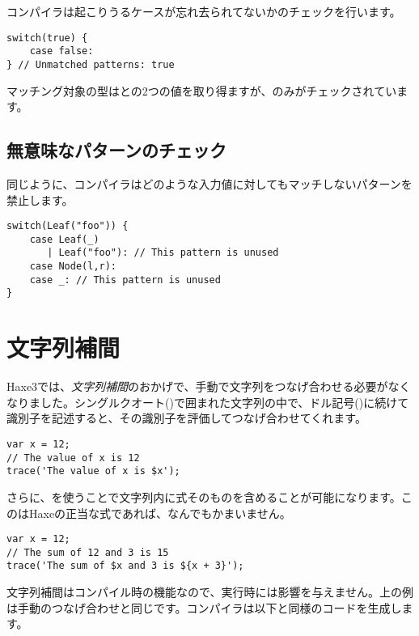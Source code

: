 コンパイラは起こりうるケースが忘れ去られてないかのチェックを行います。

\begin{lstlisting}
switch(true) {
    case false:
} // Unmatched patterns: true
\end{lstlisting}

マッチング対象の型はとの2つの値を取り得ますが、のみがチェックされています。


\subsection{無意味なパターンのチェック}
\label{lf-pattern-matching-unused}

同じように、コンパイラはどのような入力値に対してもマッチしないパターンを禁止します。

\begin{lstlisting}
switch(Leaf("foo")) {
    case Leaf(_)
       | Leaf("foo"): // This pattern is unused
    case Node(l,r):
    case _: // This pattern is unused
}
\end{lstlisting}

\section{文字列補間}
\label{lf-string-interpolation}

Haxe3では、\emph{文字列補間}のおかげで、手動で文字列をつなげ合わせる必要がなくなりました。シングルクオート()で囲まれた文字列の中で、ドル記号(\expr{\$})に続けて識別子を記述すると、その識別子を評価してつなげ合わせてくれます。

\begin{lstlisting}
var x = 12;
// The value of x is 12
trace('The value of x is $x');
\end{lstlisting}

さらに、を使うことで文字列内に式そのものを含めることが可能になります。このはHaxeの正当な式であれば、なんでもかまいません。

\begin{lstlisting}
var x = 12;
// The sum of 12 and 3 is 15
trace('The sum of $x and 3 is ${x + 3}');
\end{lstlisting}

文字列補間はコンパイル時の機能なので、実行時には影響を与えません。上の例は手動のつなげ合わせと同じです。コンパイラは以下と同様のコードを生成します。

